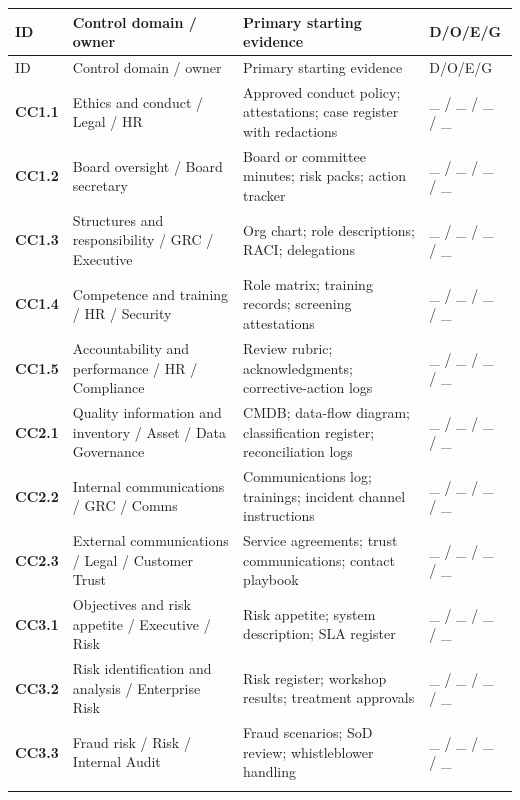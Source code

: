 \documentclass[10pt,oneside]{report}
\begin{document}
\small\begin{longtable}{@{}p{0.63in}p{2.13in}p{2.28in}p{0.92in}@{}}
\toprule ID & Control domain / owner & Primary starting evidence & D/O/E/G \\ \midrule\endfirsthead
\toprule ID & Control domain / owner & Primary starting evidence & D/O/E/G \\ \midrule\endhead
\textbf{CC1.1} & Ethics and conduct / Legal / HR & Approved conduct policy; attestations; case register with redactions & \_ / \_ / \_ / \_ \\
\addlinespace[3pt]
\textbf{CC1.2} & Board oversight / Board secretary & Board or committee minutes; risk packs; action tracker & \_ / \_ / \_ / \_ \\
\addlinespace[3pt]
\textbf{CC1.3} & Structures and responsibility / GRC / Executive & Org chart; role descriptions; RACI; delegations & \_ / \_ / \_ / \_ \\
\addlinespace[3pt]
\textbf{CC1.4} & Competence and training / HR / Security & Role matrix; training records; screening attestations & \_ / \_ / \_ / \_ \\
\addlinespace[3pt]
\textbf{CC1.5} & Accountability and performance / HR / Compliance & Review rubric; acknowledgments; corrective-action logs & \_ / \_ / \_ / \_ \\
\addlinespace[3pt]
\textbf{CC2.1} & Quality information and inventory / Asset / Data Governance & CMDB; data-flow diagram; classification register; reconciliation logs & \_ / \_ / \_ / \_ \\
\addlinespace[3pt]
\textbf{CC2.2} & Internal communications / GRC / Comms & Communications log; trainings; incident channel instructions & \_ / \_ / \_ / \_ \\
\addlinespace[3pt]
\textbf{CC2.3} & External communications / Legal / Customer Trust & Service agreements; trust communications; contact playbook & \_ / \_ / \_ / \_ \\
\addlinespace[3pt]
\textbf{CC3.1} & Objectives and risk appetite / Executive / Risk & Risk appetite; system description; SLA register & \_ / \_ / \_ / \_ \\
\addlinespace[3pt]
\textbf{CC3.2} & Risk identification and analysis / Enterprise Risk & Risk register; workshop results; treatment approvals & \_ / \_ / \_ / \_ \\
\addlinespace[3pt]
\textbf{CC3.3} & Fraud risk / Risk / Internal Audit & Fraud scenarios; SoD review; whistleblower handling & \_ / \_ / \_ / \_ \\
\addlinespace[3pt]

\end{longtable}
\end{document}

